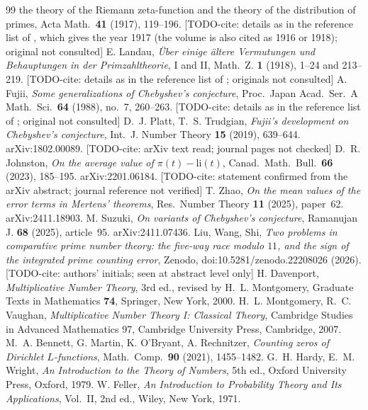 \documentclass[11pt]{amsart}
\theoremstyle{definition}
\numberwithin{equation}{section}
\newcommand{\todocite}[1]{\textsf{[TODO-cite: #1]}}
\begin{document}
\begin{thebibliography}{99}
{the theory of the Riemann zeta-function and the theory of the
distribution of primes}, Acta Math.\ \textbf{41} (1917), 119--196.
\todocite{details as in the reference list of \cite{PT19}, which
gives the year 1917 (the volume is also cited as 1916 or 1918);
original not consulted}
 E. Landau, \emph{\"Uber einige \"altere Vermutungen
und Behauptungen in der Primzahltheorie}, I and II, Math.\ Z.
\textbf{1} (1918), 1--24 and 213--219. \todocite{details as in the
reference list of \cite{PT19}; originals not consulted}
 A. Fujii, \emph{Some generalizations of Chebyshev's
conjecture}, Proc.\ Japan Acad.\ Ser.~A Math.\ Sci.\ \textbf{64}
(1988), no.~7, 260--263. \todocite{details as in the reference list
of \cite{PT19}; original not consulted}
 D.~J. Platt, T.~S. Trudgian, \emph{Fujii's development
on Chebyshev's conjecture}, Int.\ J. Number Theory \textbf{15}
(2019), 639--644. arXiv:1802.00089. \todocite{arXiv text read; journal
pages not checked}
 D.~R. Johnston, \emph{On the average value of
$\pi(t)-\mathrm{li}(t)$}, Canad.\ Math.\ Bull.\ \textbf{66} (2023),
185--195. arXiv:2201.06184. \todocite{statement confirmed from the
arXiv abstract; journal reference not verified}
 T. Zhao, \emph{On the mean values of the error terms
in Mertens' theorems}, Res.\ Number Theory \textbf{11} (2025),
paper~62. arXiv:2411.18903.
 M. Suzuki, \emph{On variants of Chebyshev's
conjecture}, Ramanujan J. \textbf{68} (2025), article~95.
arXiv:2411.07436.
 Liu, Wang, Shi, \emph{Two problems in comparative
prime number theory: the five-way race modulo $11$, and the sign of
the integrated prime counting error}, Zenodo,
doi:10.5281/zenodo.22208026 (2026). \todocite{authors' initials;
seen at abstract level only}
 H. Davenport, \emph{Multiplicative Number Theory},
3rd ed., revised by H.~L. Montgomery, Graduate Texts in Mathematics
\textbf{74}, Springer, New York, 2000.
 H.~L. Montgomery, R.~C. Vaughan, \emph{Multiplicative
Number Theory I: Classical Theory}, Cambridge Studies in Advanced
Mathematics 97, Cambridge University Press, Cambridge, 2007.
 M.~A. Bennett, G. Martin, K. O'Bryant,
A. Rechnitzer, \emph{Counting zeros of Dirichlet $L$-functions},
Math.\ Comp.\ \textbf{90} (2021), 1455--1482.
 G.~H. Hardy, E.~M. Wright, \emph{An Introduction to the
Theory of Numbers}, 5th ed., Oxford University Press, Oxford, 1979.
 W. Feller, \emph{An Introduction to Probability Theory
and Its Applications}, Vol.~II, 2nd ed., Wiley, New York, 1971.

\end{thebibliography}
\end{document}
